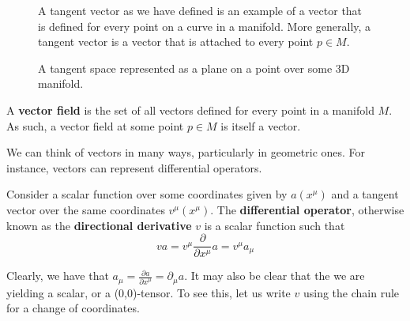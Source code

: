 \documentclass{article}
\begin{document}
 			\begin{figure}[h]
 				\begin{minipage}{0.4\textwidth}
 					\center
 					\caption{A tangent space represented as a plane on a point over some 3D manifold.}
 				\end{minipage}
 				\hfill
 				\begin{minipage}{0.54\textwidth}
 					\begin{spacing}{1.5}
 						A tangent vector as we have defined is an example of a vector that is defined for every point on a curve in a manifold. More generally, a tangent vector is a vector that is attached to every point $p \in M$.
 					\end{spacing}
 				\end{minipage}
 			\end{figure}
 			\vspace{-0.5cm}
 			\begin{defn}
 				A \textbf{vector field} is the set of all vectors defined for every point in a manifold $M$. As such, a vector field at some point $p\in M$ is itself a vector.
 			\end{defn}
 			We can think of vectors in many ways, particularly in geometric ones. For instance, vectors can represent differential operators. 
 			\begin{defn}
 				Consider a scalar function over some coordinates given by $a(x^\mu)$ and a tangent vector over the same coordinates $v^{\mu} (x^\mu)$. The \textbf{differential operator}, otherwise known as the \textbf{directional derivative} $v$ is a scalar function such that
 				\begin{equation}
 					\label{eq:DifferentialOperator}
 					\boxed{va = v^{\mu} \frac{\partial}{\partial x^\mu} a = v^\mu a_\mu}
 				\end{equation}
 			\end{defn}
 			Clearly, we have that $a_\mu = \frac{\partial a}{\partial x^\mu} = \partial_\mu a$. It may also be clear that the we are yielding a scalar, or a (0,0)-tensor. To see this, let us write $v$ using the chain rule for a change of coordinates.
\end{document}
